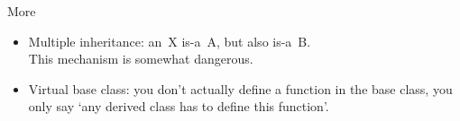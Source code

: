 \begin{block}{More}
  \label{sl:obj-more}  
  \begin{itemize}
  \item  Multiple inheritance: an~X is-a~A, but also is-a~B.\\
    This mechanism is somewhat dangerous.
  \item Virtual base class: you don't actually define a function in
    the base class, you only say `any derived class has to define this
    function'.
  \end{itemize}
\end{block}

